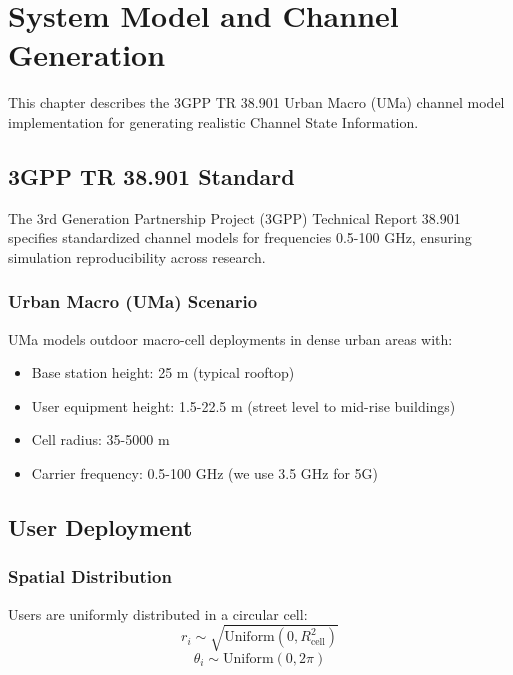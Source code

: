 \chapter{System Model and Channel Generation}
\label{chap:channel}

This chapter describes the 3GPP TR 38.901 Urban Macro (UMa) channel model implementation for generating realistic Channel State Information.

\section{3GPP TR 38.901 Standard}

The 3rd Generation Partnership Project (3GPP) Technical Report 38.901 \cite{3gpp38901} specifies standardized channel models for frequencies 0.5-100 GHz, ensuring simulation reproducibility across research.

\subsection{Urban Macro (UMa) Scenario}

UMa models outdoor macro-cell deployments in dense urban areas with:
\begin{itemize}
    \item Base station height: 25 m (typical rooftop)
    \item User equipment height: 1.5-22.5 m (street level to mid-rise buildings)
    \item Cell radius: 35-5000 m
    \item Carrier frequency: 0.5-100 GHz (we use 3.5 GHz for 5G)
\end{itemize}

\section{User Deployment}

\subsection{Spatial Distribution}

Users are uniformly distributed in a circular cell:
\begin{equation}
r_i \sim \sqrt{\text{Uniform}(0, R_{\text{cell}}^2)}
\end{equation}
\begin{equation}
\theta_i \sim \text{Uniform}(0, 2\pi)
\end{equation}

